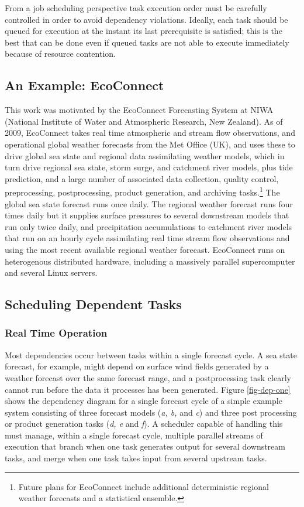 \documentclass[11pt,a4paper]{article}
\begin{document}
From a job scheduling perspective task execution order must be carefully
controlled in order to avoid dependency violations. Ideally, each task
should be queued for execution at the instant its last prerequisite is
satisfied; this is the best that can be done even if queued tasks are
not able to execute immediately because of resource contention.


\subsection{An Example: EcoConnect}

This work was motivated by the EcoConnect Forecasting System at NIWA
(National Institute of Water and Atmospheric Research, New Zealand). As
of 2009, EcoConnect takes real time atmospheric and stream flow
observations, and operational global weather forecasts from the Met
Office (UK), and uses these to drive global sea state and regional data
assimilating weather models, which in turn drive regional sea state,
storm surge, and catchment river models, plus tide prediction, and a
large number of associated data collection, quality control,
preprocessing, postprocessing, product generation, and archiving
tasks.\footnote{Future plans for EcoConnect include additional
deterministic regional weather forecasts and a statistical ensemble.}
The global sea state forecast runs once daily.  The regional weather
forecast runs four times daily but it supplies surface pressures to
several downstream models that run only twice daily, and precipitation
accumulations to catchment river models that run on an hourly cycle
assimilating real time stream flow observations and using the most
recent available regional weather forecast.  EcoConnect runs on
heterogenous distributed hardware, including a massively parallel
supercomputer and several Linux servers. 

\pagebreak
\subsection{Scheduling Dependent Tasks }

\subsubsection{Real Time Operation}

Most dependencies occur between tasks within a single forecast cycle. A
sea state forecast, for example, might depend on surface wind fields
generated by a weather forecast over the same forecast range, and a
postprocessing task clearly cannot run before the data it processes
has been generated. Figure
\ref{fig-dep-one} shows the dependency diagram for a single forecast
cycle of a simple example system consisting of three forecast models
({\em a, b,} and {\em c}) and three post processing or product
generation tasks ({\em d, e} and {\em f}).  A scheduler capable of
handling this must manage, within a single forecast cycle, multiple
parallel streams of execution that branch when one task generates output
for several downstream tasks, and merge when one task takes input from
several upstream tasks. 
\end{document}
